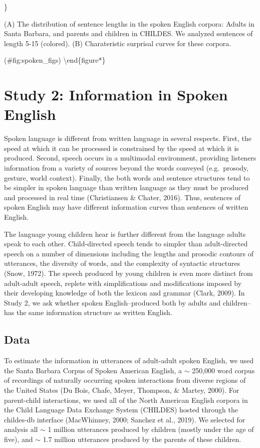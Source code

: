 \documentclass[man,floatsintext]{apa6}
\begin{document}
\}

\caption{(A) The distribution of sentence lengths in the spoken English corpora: Adults in Santa Barbara, and parents and children in CHILDES. We analyzed sentences of length 5-15 (colored). (B) Charateristic surprisal curves for these corpora.}

(\#fig:spoken\_figs)
\textbackslash{}end\{figure*\}

\hypertarget{study-2-information-in-spoken-english}{%
\section{Study 2: Information in Spoken English}\label{study-2-information-in-spoken-english}}

Spoken language is different from written language in several respects. First, the speed at which it can be processed is constrained by the speed at which it is produced. Second, speech occurs in a multimodal environment, providing listeners information from a variety of sources beyond the words conveyed (e.g.~prosody, gesture, world context). Finally, the both words and sentence structures tend to be simpler in spoken language than written language as they must be produced and processed in real time (Christiansen \& Chater, 2016). Thus, sentences of spoken English may have different information curves than sentences of written English.

The language young children hear is further different from the language adults speak to each other. Child-directed speech tends to simpler than adult-directed speech on a number of dimensions including the lengths and prosodic contours of utterances, the diversity of words, and the complexity of syntactic structures (Snow, 1972). The speech produced by young children is even more distinct from adult-adult speech, replete with simplifications and modifications imposed by their developing knowledge of both the lexicon and grammar (Clark, 2009). In Study 2, we ask whether spoken English--produced both by adults and children-- has the same information structure as written English.

\hypertarget{data-1}{%
\subsection{Data}\label{data-1}}

To estimate the information in utterances of adult-adult spoken English, we used the Santa Barbara Corpus of Spoken American English, a \(\sim\) 250,000 word corpus of recordings of naturally occurring spoken interactions from diverse regions of the United States (Du Bois, Chafe, Meyer, Thompson, \& Martey, 2000). For parent-child interactions, we used all of the North American English corpora in the Child Language Data Exchange System (CHILDES) hosted through the childes-db interface (MacWhinney, 2000; Sanchez et al., 2019). We selected for analysis all \(\sim\) 1 million utterances produced by children (mostly under the age of five), and \(\sim\) 1.7 million utterances produced by the parents of these children.
\end{document}

